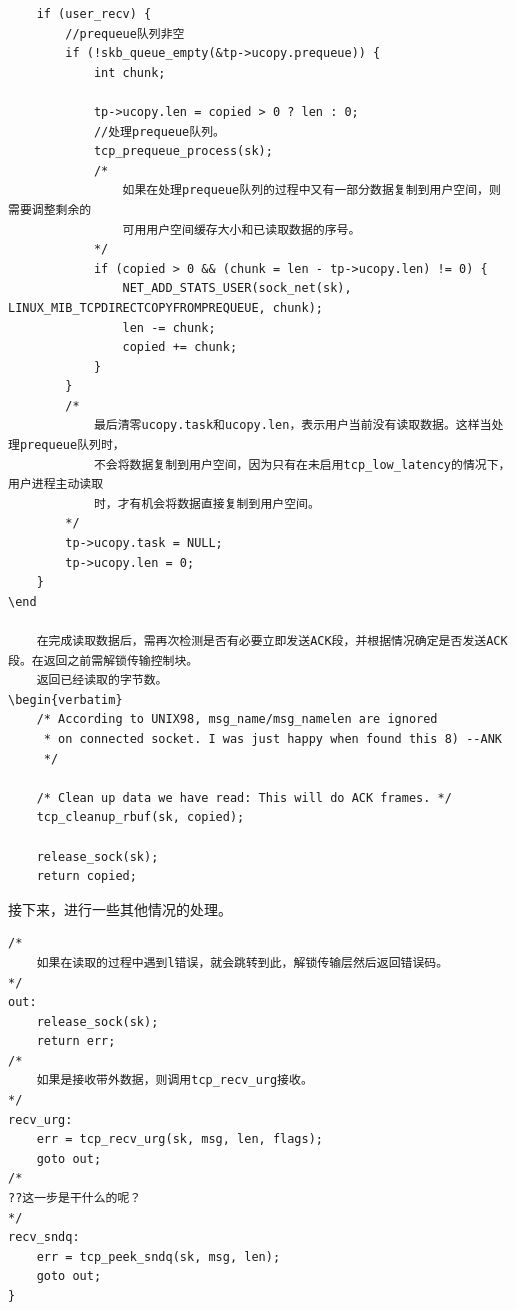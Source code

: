 	
\begin{verbatim}
	if (user_recv) {
		//prequeue队列非空
		if (!skb_queue_empty(&tp->ucopy.prequeue)) {
			int chunk;

			tp->ucopy.len = copied > 0 ? len : 0;
			//处理prequeue队列。
			tcp_prequeue_process(sk);
			/*
				如果在处理prequeue队列的过程中又有一部分数据复制到用户空间，则需要调整剩余的
				可用用户空间缓存大小和已读取数据的序号。
			*/
			if (copied > 0 && (chunk = len - tp->ucopy.len) != 0) {
				NET_ADD_STATS_USER(sock_net(sk), LINUX_MIB_TCPDIRECTCOPYFROMPREQUEUE, chunk);
				len -= chunk;
				copied += chunk;
			}
		}
		/*
			最后清零ucopy.task和ucopy.len，表示用户当前没有读取数据。这样当处理prequeue队列时，
			不会将数据复制到用户空间，因为只有在未启用tcp_low_latency的情况下，用户进程主动读取
			时，才有机会将数据直接复制到用户空间。
		*/
		tp->ucopy.task = NULL;
		tp->ucopy.len = 0;
	}
\end
	
	在完成读取数据后，需再次检测是否有必要立即发送ACK段，并根据情况确定是否发送ACK段。在返回之前需解锁传输控制块。
	返回已经读取的字节数。
\begin{verbatim}
	/* According to UNIX98, msg_name/msg_namelen are ignored
	 * on connected socket. I was just happy when found this 8) --ANK
	 */

	/* Clean up data we have read: This will do ACK frames. */
	tcp_cleanup_rbuf(sk, copied);

	release_sock(sk);
	return copied;
\end{verbatim}
	接下来，进行一些其他情况的处理。
\begin{verbatim}
/*
	如果在读取的过程中遇到l错误，就会跳转到此，解锁传输层然后返回错误码。
*/
out:
	release_sock(sk);
	return err;
/*
	如果是接收带外数据，则调用tcp_recv_urg接收。
*/
recv_urg:
	err = tcp_recv_urg(sk, msg, len, flags);
	goto out;
/*
??这一步是干什么的呢？
*/
recv_sndq:
	err = tcp_peek_sndq(sk, msg, len);
	goto out;
}
\end{verbatim}

